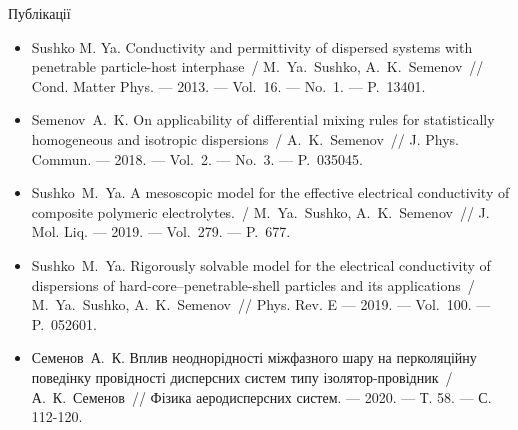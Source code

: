 \documentclass[10pt]{beamer}
\begin{document}
\begin{frame}{Публікації}
\footnotesize
  \begin{itemize}
    \item
    Sushko M. Ya. Conductivity and permittivity of dispersed systems 
    with penetrable particle-host interphase~/ M.~Ya.~Sushko, 
    A.~K.~Semenov~// Cond. Matter Phys. --- 2013. --- Vol.~16. --- No.~1. 
    --- P.~13401.
    
    \item
    Semenov~A.~K. On applicability of differential mixing rules for
      statistically homogeneous and isotropic dispersions~/ A.~K.~Semenov~//
      J. Phys. Commun. --- 2018. --- Vol.~2. --- No.~3. --- P.~035045.
    
    \item
    Sushko~M.~Ya. A mesoscopic model for the effective electrical 
    conductivity of composite polymeric electrolytes.~/ M.~Ya.~Sushko,
    A.~K.~Semenov~// J. Mol. Liq. --- 2019. --- Vol.~279. --- P.~677. 
    
    \item
    Sushko~M.~Ya. Rigorously solvable model for the electrical conductivity of dispersions of hard-core--penetrable-shell particles and its applications~/
    M.~Ya.~Su\-shko, A.~K.~Semenov~//
    Phys. Rev. E --- 2019. --- Vol.~100. --- P.~052601.
    
    \item
    Семенов~А.~К. Вплив неоднорідності міжфазного шару на перколяційну поведінку провідності дисперсних систем типу ізолятор-провідник~/ А.~К.~Семенов~// Фізика аеродисперсних систем. --- 2020. --- Т. 58. --- С. 112-120.
  \end{itemize}

\end{frame}
\end{document}
